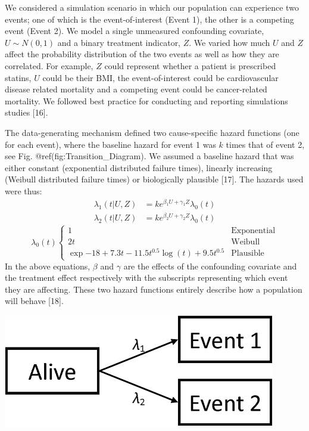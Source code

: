 \documentclass[12pt,PhD,twoside,openright]{muthesis}
\begin{document}
We considered a simulation scenario in which our population can experience two events; one of which is the event-of-interest (Event 1), the other is a competing event (Event 2). We model a single unmeasured confounding covariate, \(U \sim N (0,1)\) and a binary treatment indicator, \(Z\). We varied how much \(U\) and \(Z\) affect the probability distribution of the two events as well as how they are correlated. For example, \(Z\) could represent whether a patient is prescribed statins, \(U\) could be their BMI, the event-of-interest could be cardiovascular disease related mortality and a competing event could be cancer-related mortality. We followed best practice for conducting and reporting simulations studies {[}16{]}.

The data-generating mechanism defined two cause-specific hazard functions (one for each event), where the baseline hazard for event 1 was \(k\) times that of event 2, see Fig. @ref(fig:Transition\_Diagram). We assumed a baseline hazard that was either constant (exponential distributed failure times), linearly increasing (Weibull distributed failure times) or biologically plausible {[}17{]}. The hazards used were thus:
\begin{align}
\lambda_1(t|U,Z) &= ke^{\beta_1U + \gamma_1Z}\lambda_0(t)\\
\lambda_2(t|U,Z) &= ke^{\beta_2U + \gamma_2Z}\lambda_0(t)
\end{align}
\begin{equation}
\lambda_0(t) \begin{cases}
1 & \textrm{Exponential}\\
2t & \textrm{Weibull}\\
\exp{-18+7.3t-11.5t^{0.5}\log(t) + 9.5t^{0.5}} & \textrm{Plausible}
\end{cases}
\end{equation}
In the above equations, \(\beta\) and \(\gamma\) are the effects of the confounding covariate and the treatment effect respectively with the subscripts representing which event they are affecting. These two hazard functions entirely describe how a population will behave {[}18{]}.

\includegraphics[width=450px]{figure/CR_Conf/Transition_Diagram}
\end{document}
